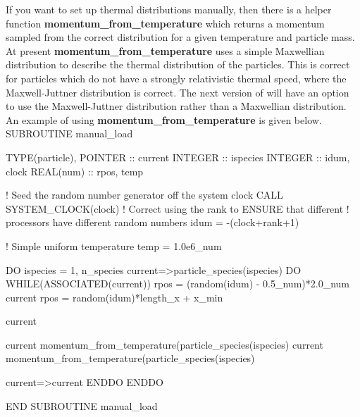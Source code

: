 \documentclass[12pt,a4paper]{article}
\newcommand{\EPOCH}{{\color{warwickdark}\fontfamily{phv}\selectfont{EPOCH}}}
\newenvironment{boxverbatim}{\lboxverbatim{none}}{\endlboxverbatim}
\begin{document}
If you want to set up thermal distributions manually, then there is a helper
function {\bf momentum\_from\_temperature} which returns a momentum sampled from
the correct distribution for a given temperature and particle mass. At present
{\bf momentum\_from\_temperature} uses a simple Maxwellian distribution to
describe the thermal distribution of the particles. This is correct for
particles which do not have a strongly relativistic thermal speed, where the
Maxwell-Juttner distribution is correct. The next version of {\EPOCH} will have
an option to use the Maxwell-Juttner distribution rather than a Maxwellian
distribution. An example of using {\bf momentum\_from\_temperature} is given
below.
\begin{boxverbatim}
SUBROUTINE manual_load

  TYPE(particle), POINTER :: current
  INTEGER :: ispecies
  INTEGER :: idum, clock
  REAL(num) :: rpos, temp

  ! Seed the random number generator off the system clock
  CALL SYSTEM_CLOCK(clock)
  ! Correct using the rank to ENSURE that different
  ! processors have different random numbers
  idum = -(clock+rank+1)

  ! Simple uniform temperature
  temp = 1.0e6_num

  DO ispecies = 1, n_species
    current=>particle_species(ispecies)%
    DO WHILE(ASSOCIATED(current))
      rpos = (random(idum) - 0.5_num)*2.0_num
      current%
      rpos = random(idum)*length_x + x_min

      current%

      current%
          momentum_from_temperature(particle_species(ispecies)%
      current%
          momentum_from_temperature(particle_species(ispecies)%

      current=>current%
    ENDDO
  ENDDO

END SUBROUTINE manual_load
\end{boxverbatim}
\end{document}
